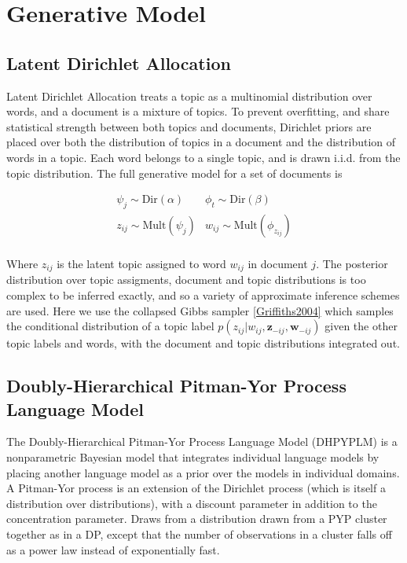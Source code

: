 \section{Generative Model}

\subsection{Latent Dirichlet Allocation}

Latent Dirichlet Allocation treats a topic as a multinomial distribution over words, and a document is a mixture of topics.  To prevent overfitting, and share statistical strength between both topics and documents, Dirichlet priors are placed over both the distribution of topics in a document and the distribution of words in a topic.  Each word belongs to a single topic, and is drawn i.i.d. from the topic distribution.  The full generative model for a set of documents is

\[
\begin{array}{cc}
\psi_j \sim \textrm{Dir}(\alpha) \nonumber &
\phi_t  \sim \textrm{Dir}(\beta) \nonumber \\
z_{ij} \sim \textrm{Mult}(\psi_j) \nonumber &
w_{ij} \sim \textrm{Mult}(\phi_{z_{ij}}) \\
\end{array}
\]

Where $z_{ij}$ is the latent topic assigned to word $w_{ij}$ in document $j$.  The posterior distribution over topic assigments, document and topic distributions is too complex to be inferred exactly, and so a variety of approximate inference schemes are used.  Here we use the collapsed Gibbs sampler \ref{Griffiths2004} which samples the conditional distribution of a topic label $p(z_{ij} | w_{ij}, \mathbf{z}_{-ij}, \mathbf{w}_{-ij})$ given the other topic labels and words, with the document and topic distributions integrated out.

\subsection{Doubly-Hierarchical Pitman-Yor Process Language Model}

The Doubly-Hierarchical Pitman-Yor Process Language Model (DHPYPLM) is a nonparametric Bayesian model that integrates individual language models by placing another language model as a prior over the models in individual domains.  A Pitman-Yor process is an extension of the Dirichlet process (which is itself a distribution over distributions), with a discount parameter in addition to the concentration parameter.  Draws from a distribution drawn from a PYP cluster together as in a DP, except that the number of observations in a cluster falls off as a power law instead of exponentially fast.  

